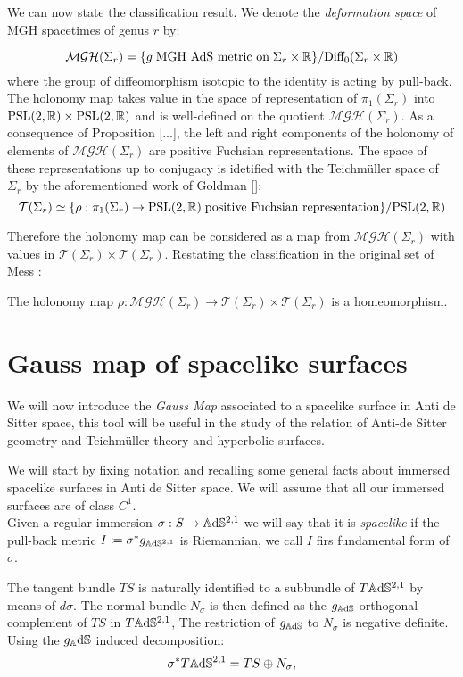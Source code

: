 We can now state the classification result. We denote the \textit{deformation space} of MGH spacetimes of genus $r$ by:

\[
    \mathcal{MGH}(\Sigma_r)=\{g\;\text{MGH AdS metric on}\;\Sigma_r\times\mathbb{R}\}/\text{Diff}_0(\Sigma_r\times\mathbb{R})
\]
where the group of diffeomorphism isotopic to the identity is acting by pull-back. The holonomy map takes value in the space of representation of $\pi_1(\Sigma_r)$ into $\text{PSL}(2,\mathbb{R})\times\text{PSL}(2,\mathbb{R})$ and is well-defined on the quotient $ \mathcal{MGH}(\Sigma_r).$
As a consequence of Proposition [...], the left and right components of the holonomy of elements of $ \mathcal{MGH}(\Sigma_r)$ are positive Fuchsian representations. The space of these representations up to conjugacy is idetified with the Teichm\"uller space of $\Sigma_r$ by the aforementioned work of Goldman []:
\[
    \mathcal{T}(\Sigma_r)\simeq\{\rho:\pi_1(\Sigma_r)\to\text{PSL}(2,\mathbb{R})\;\text{positive Fuchsian representation}\}/\text{PSL}(2,\mathbb{R})
\]

Therefore the holonomy map can be considered as a map from $ \mathcal{MGH}(\Sigma_r)$ with values in $\mathcal{T}(\Sigma_r)\times\mathcal{T}(\Sigma_r).$ Restating the classification in the original set of Mess \cite{Mess}: 
\begin{theorem}
    The holonomy map $\rho:\mathcal{MGH}(\Sigma_r)\to\mathcal{T}(\Sigma_r)\times\mathcal{T}(\Sigma_r)$ is a homeomorphism.
\end{theorem}
\section{Gauss map of spacelike surfaces}
    We will now introduce the \textit{Gauss Map} associated to a spacelike surface in Anti de Sitter space, this tool will be  useful in the study of the relation of Anti-de Sitter geometry and Teichm\"uller theory and hyperbolic surfaces.

    We will start by fixing notation and recalling some general facts about immersed spacelike surfaces in Anti de Sitter space. We will assume that all our immersed surfaces are of class $C^1$. \\
    Given a regular immersion $\sigma: S\to\mathbb{A}\mathrm{d}\mathbb{S}^{2,1}$ we will say that it is \textit{spacelike} if the pull-back metric $I\coloneqq\sigma^*g_{\mathbb{A}\mathrm{d}\mathbb{S}^{2,1}}$ is Riemannian, we call $I$ firs fundamental form of $\sigma$. 

The tangent bundle $TS$ is naturally identified to a subbundle of $T\mathbb{A}\mathrm{d}\mathbb{S}^{2,1}$ by means of $d\sigma$. The normal bundle $N_\sigma$ is then defined as the $g_{\mathbb{A}\mathrm{d}\mathbb{S}}$-orthogonal complement of $TS$ in $T\mathbb{A}\mathrm{d}\mathbb{S}^{2,1}$, The restriction of $g_{\mathbb{A}\mathrm{d}\mathbb{S}}$ to $N_\sigma$ is negative definite. Using the $g_\mathbb{A}\mathrm{d}\mathbb{S}$ induced decomposition: 
\[
\sigma^*T\mathbb{A}\mathrm{d}\mathbb{S}^{2,1}=TS\oplus N_\sigma,    
\]

